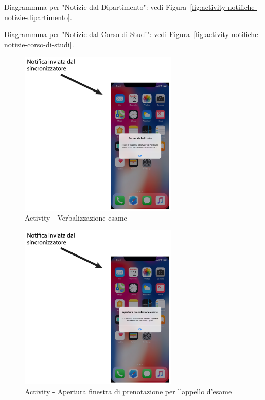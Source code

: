 Diagrammma per "Notizie dal Dipartimento": vedi Figura~\vref{fig:activity-notifiche-notizie-dipartimento}.

Diagrammma per "Notizie dal Corso di Studi": vedi Figura~\vref{fig:activity-notifiche-notizie-corso-di-studi}.

\begin{figure}
	\centering
	\includegraphics[width=0.67\textwidth]{imgs/gruppo2/activity-notifiche-verbalizzazione-esame}
	\caption{Activity - Verbalizzazione esame}
	\label{fig:activity-notifiche-verbalizzazione-esame}
\end{figure}

\begin{figure}
	\centering
	\includegraphics[width=0.67\textwidth]{imgs/gruppo2/activity-notifiche-apertura-prenotazione-esame}
	\caption{Activity - Apertura finestra di prenotazione per l'appello d'esame}
	\label{fig:activity-notifiche-apertura-finestra-esame}
\end{figure}

